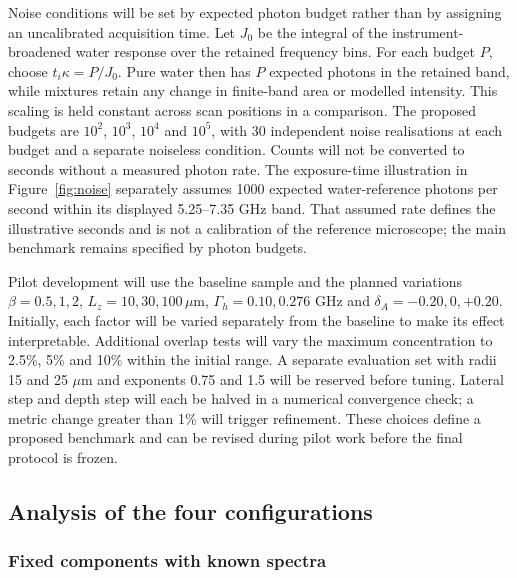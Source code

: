 \documentclass[11pt]{article}
\begin{document}
Noise conditions will be set by expected photon budget rather than by assigning an uncalibrated acquisition time. Let $J_0$ be the integral of the instrument-broadened water response over the retained frequency bins. For each budget $P$, choose $t_i\kappa=P/J_0$. Pure water then has $P$ expected photons in the retained band, while mixtures retain any change in finite-band area or modelled intensity. This scaling is held constant across scan positions in a comparison. The proposed budgets are $10^2$, $10^3$, $10^4$ and $10^5$, with 30 independent noise realisations at each budget and a separate noiseless condition. Counts will not be converted to seconds without a measured photon rate. The exposure-time illustration in Figure~\ref{fig:noise} separately assumes 1000 expected water-reference photons per second within its displayed 5.25--7.35 GHz band. That assumed rate defines the illustrative seconds and is not a calibration of the reference microscope; the main benchmark remains specified by photon budgets.

Pilot development will use the baseline sample and the planned variations $\beta=0.5,1,2$, $L_z=10,30,100\,\mu\mathrm m$, $\Gamma_h=0.10,0.276$ GHz and $\delta_A=-0.20,0,+0.20$. Initially, each factor will be varied separately from the baseline to make its effect interpretable. Additional overlap tests will vary the maximum concentration to 2.5\%, 5\% and 10\% within the initial range. A separate evaluation set with radii 15 and 25 $\mu\mathrm m$ and exponents 0.75 and 1.5 will be reserved before tuning. Lateral step and depth step will each be halved in a numerical convergence check; a metric change greater than 1\% will trigger refinement. These choices define a proposed benchmark and can be revised during pilot work before the final protocol is frozen.


\subsection{Analysis of the four configurations}
\subsubsection{Fixed components with known spectra}
\end{document}
